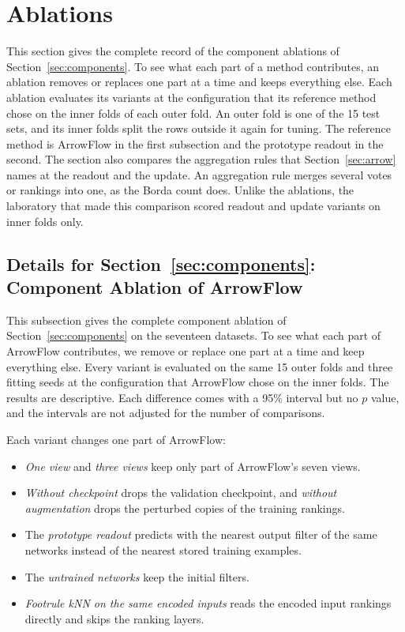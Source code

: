 \section{Ablations}\label{supp:ablations}

This section gives the complete record of the component ablations of Section~\ref{sec:components}. To see what each part of a method contributes, an ablation removes or replaces one part at a time and keeps everything else. Each ablation evaluates its variants at the configuration that its reference method chose on the inner folds of each outer fold. An outer fold is one of the 15 test sets, and its inner folds split the rows outside it again for tuning. The reference method is ArrowFlow in the first subsection and the prototype readout in the second. The section also compares the aggregation rules that Section~\ref{sec:arrow} names at the readout and the update. An aggregation rule merges several votes or rankings into one, as the Borda count does. Unlike the ablations, the laboratory that made this comparison scored readout and update variants on inner folds only.

\FloatBarrier
\subsection{Details for Section~\ref*{sec:components}: Component Ablation of ArrowFlow}\label{supp:ablation-arrowflow}

This subsection gives the complete component ablation of Section~\ref{sec:components} on the seventeen datasets. To see what each part of ArrowFlow contributes, we remove or replace one part at a time and keep everything else. Every variant is evaluated on the same 15 outer folds and three fitting seeds at the configuration that ArrowFlow chose on the inner folds. The results are descriptive. Each difference comes with a 95\% interval but no $p$ value, and the intervals are not adjusted for the number of comparisons.

Each variant changes one part of ArrowFlow:
\begin{itemize}[leftmargin=2em,topsep=2pt,itemsep=1pt]
  \item \emph{One view} and \emph{three views} keep only part of ArrowFlow's seven views.
  \item \emph{Without checkpoint} drops the validation checkpoint, and \emph{without augmentation} drops the perturbed copies of the training rankings.
  \item The \emph{prototype readout} predicts with the nearest output filter of the same networks instead of the nearest stored training examples.
  \item The \emph{untrained networks} keep the initial filters.
  \item \emph{Footrule kNN on the same encoded inputs} reads the encoded input rankings directly and skips the ranking layers.
\end{itemize}

